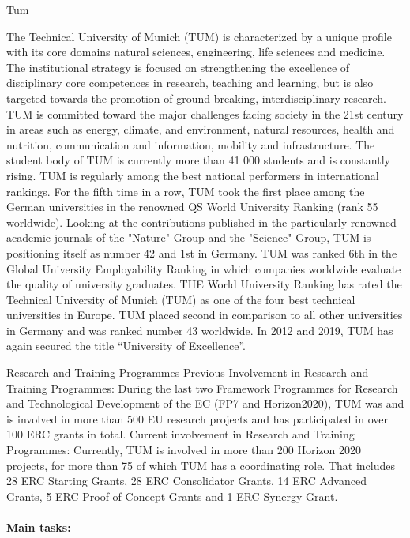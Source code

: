 \begin{sitedescription}{Tum}


The Technical University of Munich (TUM) is characterized by a unique profile with its core domains natural sciences, engineering, life sciences and medicine. The institutional strategy is focused on strengthening the excellence of disciplinary core competences in research, teaching and learning, but is also targeted towards the promotion of ground-breaking, interdisciplinary research. TUM is committed toward the major challenges facing society in the 21st century in areas such as energy, climate, and environment, natural resources, health and nutrition, communication and information, mobility and infrastructure.
The student body of TUM is currently more than 41 000 students and is constantly rising. TUM is regularly among the best national performers in international rankings. For the fifth time in a row, TUM took the first place among the German universities in the renowned QS World University Ranking (rank 55 worldwide). Looking at the contributions published in the particularly renowned academic journals of the "Nature" Group and the "Science" Group, TUM is positioning itself as number 42 and 1st in Germany. TUM was ranked 6th in the Global University Employability Ranking in which companies worldwide evaluate the quality of university graduates. THE World University Ranking has rated the Technical University of Munich (TUM) as one of the four best technical universities in Europe. TUM placed second in comparison to all other universities in Germany and was ranked number 43 worldwide. 
In 2012 and 2019, TUM has again secured the title ``University of Excellence''.

Research and Training Programmes
Previous Involvement in Research and Training Programmes:
During the last two Framework Programmes for Research and Technological Development of the EC (FP7 and Horizon2020), TUM was and is involved in more than 500 EU research projects and has participated in over 100 ERC grants in total.
Current involvement in Research and Training Programmes: 
Currently, TUM is involved in more than 200 Horizon 2020 projects, for more than 75 of which TUM has a coordinating role. That includes 28 ERC Starting Grants, 28 ERC Consolidator Grants, 14 ERC Advanced Grants, 5 ERC Proof of Concept Grants and 1 ERC Synergy Grant.

\paragraph{Main tasks:}


\end{sitedescription}
